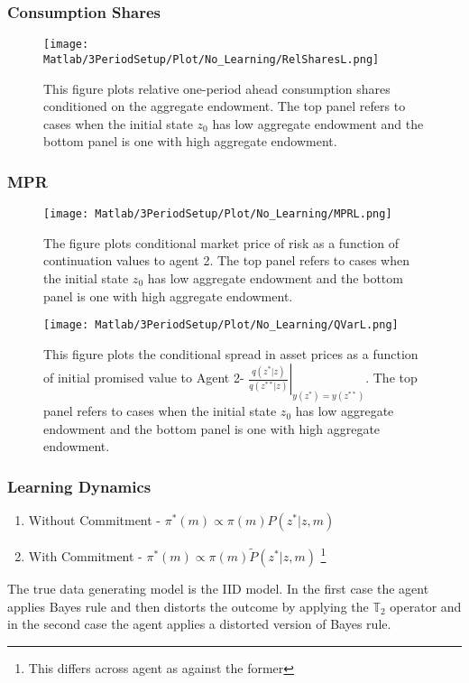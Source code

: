 \documentclass{beamer}
\theoremstyle{Definition}
\begin{document}
\begin{frame}
\frametitle{Consumption Shares}
\begin{figure}[htbp]
\centering
	  \texttt{[image: Matlab/3PeriodSetup/Plot/No\_Learning/RelSharesL.png]}

	\caption{This figure plots relative one-period ahead consumption shares conditioned on the aggregate endowment. The top panel refers to cases when the initial state $z_0$ has low aggregate endowment and the bottom panel is one with high aggregate endowment.}
	\label{fig:RelSharesL}
\end{figure} 
\end{frame}


\begin{frame}
\frametitle{MPR}

\begin{figure}[htbp]
\centering
	  \texttt{[image: Matlab/3PeriodSetup/Plot/No\_Learning/MPRL.png]}

	\caption{ The figure plots conditional market price of risk as a function of continuation values to agent 2. The top panel refers to cases when the initial state $z_0$ has low aggregate endowment and the bottom panel is one with high aggregate endowment.}
	\label{fig:MPRL}
\end{figure} 
\begin{figure}[htbp]
\centering
	  \texttt{[image: Matlab/3PeriodSetup/Plot/No\_Learning/QVarL.png]}

	\caption{This figure plots the conditional spread in asset prices as a function of initial promised value to Agent 2-  $ \left.\frac{q(z^*|z)}{q(z^{**}|z)}\right|_{y(z^*)=y(z^{**})}$. The top panel refers to cases when the initial state $z_0$ has low aggregate endowment and the bottom panel is one with high aggregate endowment.}
	\label{fig:QVarL}
\end{figure} 

\end{frame}





\begin{frame}
\frametitle{Learning Dynamics}
\begin{enumerate}
\item Without Commitment - $\pi^*(m)\propto \pi(m)P(z^*|z,m)$
\item With Commitment - $\pi^*(m)\propto \pi(m)\tilde{P}(z^*|z,m)$ \footnote{This differs across agent as against the former}
\end{enumerate}
\noindent The true data generating model is the IID model. In the first case the agent applies Bayes rule and then distorts the outcome by applying the $\mathbb{T}_2$ operator and in the second case the agent applies a distorted version of Bayes rule. 
\end{frame}
\end{document}
